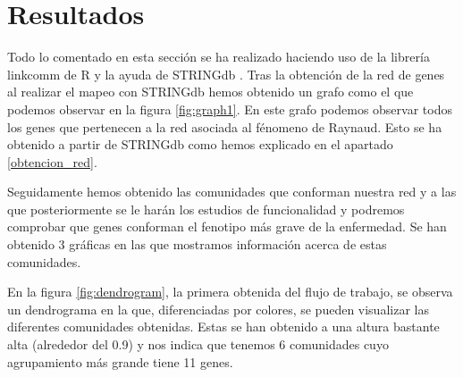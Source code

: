\section{Resultados}
\label{resultados}
\begin{spacing}{1}

Todo lo comentado en esta sección se ha realizado haciendo uso de la librería linkcomm de R y la ayuda de STRINGdb \cite{HelpNetworks} . 
Tras la obtención de la red de genes al realizar el mapeo con STRINGdb hemos obtenido un grafo como el que podemos observar en la figura \ref{fig:graph1}. En este grafo podemos observar todos los genes que pertenecen a la red asociada al fénomeno de Raynaud. Esto se ha obtenido a partir de STRINGdb como hemos explicado en el apartado \ref{obtencion_red}.

\end{spacing}

\begin{minipage}{\linewidth}
	\label{fig:graph1}
\end{minipage}

\begin{spacing}{1}
	Seguidamente hemos obtenido las comunidades que conforman nuestra red y a las que posteriormente se le harán los estudios de funcionalidad y podremos comprobar que genes conforman el fenotipo más grave de la enfermedad. Se han obtenido 3 gráficas en las que mostramos información acerca de estas comunidades.
	
	En la figura \ref{fig:dendrogram}, la primera obtenida del flujo de trabajo, se observa un dendrograma en la que, diferenciadas por colores, se pueden visualizar las diferentes comunidades obtenidas. Estas se han obtenido a una altura bastante alta (alrededor del 0.9) y nos indica que tenemos 6 comunidades cuyo agrupamiento más grande tiene 11 genes.
\end{spacing}

